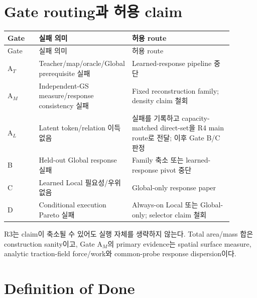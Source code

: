 \documentclass[10pt]{article}
\begin{document}
\section{Gate routing과 허용 claim}

\begin{longtable}{L{0.14\linewidth}L{0.30\linewidth}L{0.45\linewidth}}
\toprule
Gate & 실패 의미 & 허용 route\\
\midrule
\endfirsthead
\toprule
Gate & 실패 의미 & 허용 route\\
\midrule
\endhead
A\(_T\) & Teacher/map/oracle/Global prerequisite 실패 & Learned-response pipeline 중단\\
A\(_M\) & Independent-GS measure/response consistency 실패 & Fixed reconstruction family; density claim 철회\\
A\(_L\) & Latent token/relation 이득 없음 & 실패를 기록하고 capacity-matched direct-set을 R4 main route로 전달; 이후 Gate B/C 판정\\
B & Held-out Global response 실패 & Family 축소 또는 learned-response pivot 중단\\
C & Learned Local 필요성/우위 없음 & Global-only response paper\\
D & Conditional execution Pareto 실패 & Always-on Local 또는 Global-only; selector claim 철회\\
\bottomrule
\end{longtable}

R3는 claim이 축소될 수 있어도 실행 자체를 생략하지 않는다.
Total area/mass 합은 construction sanity이고, Gate A\(_M\)의 primary evidence는 spatial surface measure,
analytic traction-field force/work와 common-probe response dispersion이다.

\section{Definition of Done}
\end{document}
